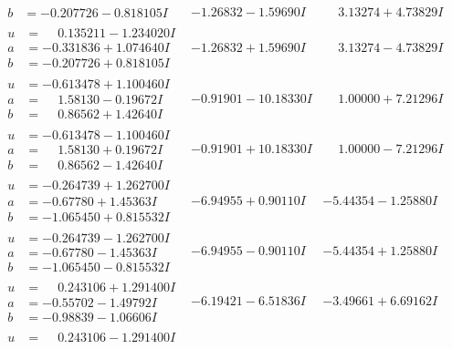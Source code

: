 \documentclass[1p]{elsarticle_modified}
\theoremstyle{definition}
\begin{document}
$$\begin{array}{c|c|c}
\begin{aligned}
b &= -0.207726 - 0.818105 I\end{aligned}
 & -1.26832 - 1.59690 I & \phantom{-}3.13274 + 4.73829 I \\ \hline\begin{aligned}
u &= \phantom{-}0.135211 - 1.234020 I \\
a &= -0.331836 + 1.074640 I \\
b &= -0.207726 + 0.818105 I\end{aligned}
 & -1.26832 + 1.59690 I & \phantom{-}3.13274 - 4.73829 I \\ \hline\begin{aligned}
u &= -0.613478 + 1.100460 I \\
a &= \phantom{-}1.58130 - 0.19672 I \\
b &= \phantom{-}0.86562 + 1.42640 I\end{aligned}
 & -0.91901 - 10.18330 I & \phantom{-}1.00000 + 7.21296 I \\ \hline\begin{aligned}
u &= -0.613478 - 1.100460 I \\
a &= \phantom{-}1.58130 + 0.19672 I \\
b &= \phantom{-}0.86562 - 1.42640 I\end{aligned}
 & -0.91901 + 10.18330 I & \phantom{-}1.00000 - 7.21296 I \\ \hline\begin{aligned}
u &= -0.264739 + 1.262700 I \\
a &= -0.67780 + 1.45363 I \\
b &= -1.065450 + 0.815532 I\end{aligned}
 & -6.94955 + 0.90110 I & -5.44354 - 1.25880 I \\ \hline\begin{aligned}
u &= -0.264739 - 1.262700 I \\
a &= -0.67780 - 1.45363 I \\
b &= -1.065450 - 0.815532 I\end{aligned}
 & -6.94955 - 0.90110 I & -5.44354 + 1.25880 I \\ \hline\begin{aligned}
u &= \phantom{-}0.243106 + 1.291400 I \\
a &= -0.55702 - 1.49792 I \\
b &= -0.98839 - 1.06606 I\end{aligned}
 & -6.19421 - 6.51836 I & -3.49661 + 6.69162 I \\ \hline\begin{aligned}
u &= \phantom{-}0.243106 - 1.291400 I \\

\end{aligned}
\end{array}$$
\end{document}
